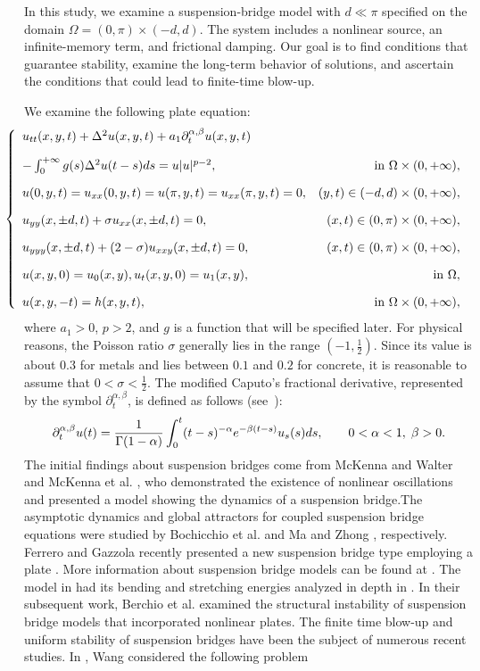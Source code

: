 \documentclass[12pt]{article}
\numberwithin{equation}{section}
\begin{document}
In this study, we examine a suspension-bridge model with $d\ll\pi$ specified on the domain $\Omega=(0,\pi)\times(-d,d)$. The system includes a nonlinear source, an infinite-memory term, and frictional damping. Our goal is to find conditions that guarantee stability, examine the long-term behavior of solutions, and ascertain the conditions that could lead to finite-time blow-up.

We examine the following plate equation:
\begin{equation} \label{mprobl}
\hspace{-0.7cm}\left\{\begin{array}{lr}
u_{t t}(x, y, t)+\Delta^{2} u(x, y, t)+a_{1} \partial_{t}^{\alpha, \beta} u(x, y, t) & \\[1em]- \int_{0}^{+\infty} g(s) \Delta^2u (t - s) ds=u|u|^{p-2}, & \text { in } \Omega \times(0,+\infty), \\[1em]
u(0, y, t)=u_{x x}(0, y, t)=u(\pi, y, t)=u_{x x}(\pi, y, t)=0, & (y, t) \in(-d, d) \times(0,+\infty), \\[1em]
u_{y y}(x, \pm d, t)+\sigma u_{x x}(x, \pm d, t)=0, & (x, t) \in(0, \pi) \times(0,+\infty), \\[1em]
u_{y y y}(x, \pm d, t)+(2-\sigma) u_{x x y}(x, \pm d, t)=0, & (x, t) \in(0, \pi) \times(0,+\infty), \\[1em]
u(x, y, 0)=u_{0}(x, y), u_{t}(x, y, 0)=u_{1}(x, y), & \text { in } \Omega,\\[1em]
u(x, y, -t)=h(x,y, t),& \text { in } \Omega\times(0,+\infty),
\end{array}\right.
\end{equation}
where $a_1 >0$,  $p > 2$, and $g$ is a function that will be specified later.  For physical reasons, the Poisson ratio $\sigma$ generally lies in the range $(-1, \frac{1}{2})$. Since its value is about $0.3$ for metals and lies between $0.1$ and $0.2$ for concrete, it is reasonable to assume that $0 <\sigma <\frac{1}{2}$.  The modified Caputo's fractional derivative, represented by the symbol $\partial_{t}^{\alpha,\beta}$, is defined as follows (see~\cite{BC,CM}):
$$
 \partial_{t}^{\alpha,\beta} u(t) = \frac{1}{\Gamma(1-\alpha)} \int_{0}^{t} (t-s)^{-\alpha} e^{-\beta(t-s)} u_{s}(s) ds, \hspace{7mm}0 < \alpha < 1,\; \beta>0.
$$
The initial findings about suspension bridges come from McKenna and Walter \cite{Meck2} and McKenna et al. \cite{Meck1}, who demonstrated the existence of nonlinear oscillations and presented a model showing the dynamics of a suspension bridge.The asymptotic dynamics and global attractors for coupled suspension bridge equations were studied by Bochicchio et al. \cite{Vuk} and Ma and Zhong \cite{Ma}, respectively.  Ferrero and Gazzola recently presented a new suspension bridge type employing a plate \cite{Ferr1}. More information about suspension bridge models can be found at \cite{Gazzola}.  The model in \cite{Ferr1} had its bending and stretching energies analyzed in depth in \cite{Algwaiz}.  In their subsequent work, Berchio et al. \cite{Berchio} examined the structural instability of suspension bridge models that incorporated nonlinear plates. The finite time blow-up and uniform stability of suspension bridges have been the subject of numerous recent studies. In \cite{Wang}, Wang  considered the following problem
\end{document}

